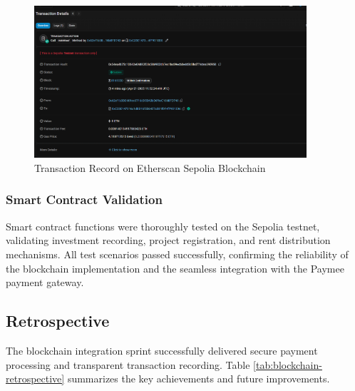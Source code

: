 \begin{figure}[htbp]
    \centering
    \includegraphics[width=0.9\textwidth]{images/etherscan_blockchain_record.png}
    \caption{Transaction Record on Etherscan Sepolia Blockchain}
    \label{fig:etherscan-blockchain-record}
\end{figure}

\subsubsection{Smart Contract Validation}
Smart contract functions were thoroughly tested on the Sepolia testnet, validating investment recording, project registration, and rent distribution mechanisms. All test scenarios passed successfully, confirming the reliability of the blockchain implementation and the seamless integration with the Paymee payment gateway.
\newpage
\subsection{Retrospective}

The blockchain integration sprint successfully delivered secure payment processing and transparent transaction recording. Table \ref{tab:blockchain-retrospective} summarizes the key achievements and future improvements.

